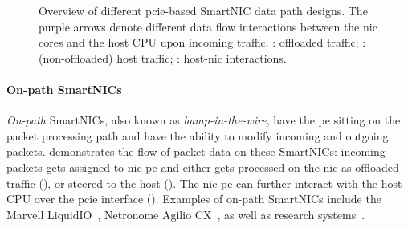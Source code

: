 \begin{figure}[tp]
    \quad
    \caption[Overview of different SmartNIC data path designs]{Overview of different \ac{pcie}-based SmartNIC data path designs.  The purple arrows denote different data flow interactions between the \ac{nic} cores and the host CPU upon incoming traffic.  : offloaded traffic; : (non-offloaded) host traffic; : host-\ac{nic} interactions.} \label{fig:smartnic-datapaths}
\end{figure}

\paragraph{On-path SmartNICs} \emph{On-path} SmartNICs, also known as \emph{bump-in-the-wire}, have the \ac{pe} sitting on the packet processing path and have the ability to modify incoming and outgoing packets.   demonstrates the flow of packet data on these SmartNICs: incoming packets gets assigned to \ac{nic} \ac{pe} and either gets processed on the \ac{nic} as offloaded traffic (), or steered to the host ().  The \ac{nic} \ac{pe} can further interact with the host CPU over the \ac{pcie} interface ().  Examples of on-path SmartNICs include the Marvell LiquidIO~\cite{noauthor_marvell_nodate}, Netronome Agilio CX~\cite{noauthor_agilio_nodate}, as well as research systems~\cite{guo_framework_2022, wang_fpganic_2022}.

